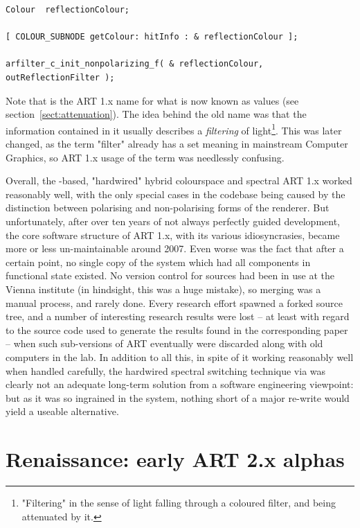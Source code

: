 \begin{verbatim}
Colour  reflectionColour;
    
[ COLOUR_SUBNODE getColour: hitInfo : & reflectionColour ];

arfilter_c_init_nonpolarizing_f( & reflectionColour, outReflectionFilter );
\end{verbatim}

Note that  is the ART 1.x name for what is now known as  values (see section~\ref{sect:attenuation}). The idea behind the old name was that the information contained in it usually describes a \emph{filtering} of light\footnote{"Filtering" in the sense of light falling through a coloured filter, and being attenuated by it.}. This was later changed, as the term "filter" already has a set meaning in mainstream Computer Graphics, so ART 1.x usage of the term was needlessly confusing.

Overall, the -based, "hardwired" hybrid colourspace and spectral ART 1.x worked reasonably well, with the only special cases in the codebase being caused by the distinction between polarising and non-polarising forms of the renderer. But unfortunately, after over ten years of not always perfectly guided development, the core software structure of ART 1.x, with its various idiosyncrasies, became more or less un-maintainable around 2007. Even worse was the fact that after a certain point, no single copy of the system which had all components in functional state existed. No version control for sources had been in use at the Vienna institute (in hindsight, this was a huge mistake), so merging was a manual process, and rarely done. Every research effort spawned a forked source tree, and a number of interesting research results were lost -- at least with regard to the source code used to generate the results found in the corresponding paper -- when such sub-versions of ART eventually were discarded along with old computers in the lab. In addition to all this, in spite of it working reasonably well when handled carefully, the hardwired spectral switching technique via  was clearly not an adequate long-term solution from a software engineering viewpoint: but as it was so ingrained in the system, nothing short of a major re-write would yield a useable alternative.


\section{Renaissance: early ART 2.x alphas}

